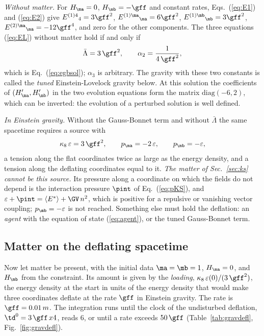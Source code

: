 \emph{Without matter.} For $H_{\ma}=0$, $H_{\mb}=-\gff$ and constant rates,
Eqs.~(\ref{eq:E1}) and (\ref{eq:E2}) give
$E^{(1)4}{}_{4}=3\gff^{2}$, $E^{(1)\ma}{}_{\ma}=6\gff^{2}$, $E^{(1)\mb}{}_{\mb}=3\gff^{2}$,
$E^{(2)\ma}{}_{\ma}=-12\gff^{4}$, and zero for the other components. The three equations
(\ref{eq:EL}) without matter hold if and only if
\begin{equation}
\bar\Lambda=3\,\gff^{2},\qquad\alpha_2=\frac{1}{4\,\gff^{2}},
\label{eq:tuned}
\end{equation}
which is Eq.~(\ref{eq:egbsol}); $\alpha_3$ is arbitrary. The gravity with these two constants is
called the \emph{tuned} Einstein-Lovelock gravity below. At this solution the coefficients of
$(H_{\ma}',H_{\mb}')$ in the two evolution equations form the matrix $\mathrm{diag}(-6,2)$, which
can be inverted: the evolution of a perturbed solution is well defined.

\emph{In Einstein gravity.} Without the Gauss-Bonnet term and without $\bar\Lambda$ the same
spacetime requires a source with
\begin{equation}
\kappa_8\,\varepsilon=3\,\gff^{2},\qquad p_{\ma}=-2\,\varepsilon,\qquad p_{\mb}=-\varepsilon ,
\label{eq:agent}
\end{equation}
a tension along the flat coordinates twice as large as the energy density, and a tension along the
deflating coordinates equal to it. \emph{The matter of Sec.~\ref{sec:ks} cannot be this source.} Its
pressure along a coordinate on which the fields do not depend is the interaction pressure $\pint$ of
Eq.~(\ref{eq:pKS}), and $\varepsilon+\pint=\langle E^{*}\rangle+\GV\,n^{2}$, which is positive for a
repulsive or vanishing vector coupling; $p_{\mb}=-\varepsilon$ is not reached. Something else must
hold the deflation: an \emph{agent} with the equation of state (\ref{eq:agent}), or the tuned
Gauss-Bonnet term.

\subsection{Matter on the deflating spacetime}

Now let matter be present, with the initial data $\ma=\mb=1$, $H_{\ma}=0$, and $H_{\mb}$ from the
constraint. Its amount is given by the \emph{loading}, $\kappa_8\,\varepsilon(0)/(3\,\gff^{2})$, the
energy density at the start in units of the energy density that would make three coordinates
deflate at the rate $\gff$ in Einstein gravity. The rate is $\gff=0.01\,m$.
 The integration
runs until the clock of the undisturbed deflation, $\td^{0}=3\,\gff\,x4$, reads 6, or until a rate
exceeds $50\,\gff$ (Table~\ref{tab:gravdefl}, Fig.~\ref{fig:gravdefl}).

